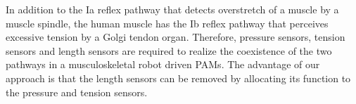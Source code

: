 In addition to the Ia reflex pathway that detects overstretch of a muscle by a muscle spindle, the human muscle has the Ib reflex pathway that perceives excessive tension by a Golgi tendon organ. Therefore, pressure sensors, tension sensors and length sensors are required to realize the coexistence of the two pathways in a musculoskeletal robot driven PAMs. The advantage of our approach is that the length sensors can be removed by allocating its function to the pressure and tension sensors.










